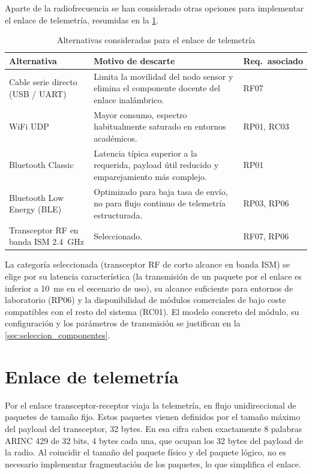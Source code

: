 Aparte de la radiofrecuencia se han considerado otras opciones para implementar el enlace de telemetría, resumidas en la \cref{tab:alternativas_enlace}.

\vspace{1em}

\begin{table}[H]
    \centering
    \caption{Alternativas consideradas para el enlace de telemetría}
    \label{tab:alternativas_enlace}
    \begin{tabularx}{\linewidth}{p{4cm} X l}
        \toprule
        \textbf{Alternativa} & \textbf{Motivo de descarte} & \textbf{Req.\ asociado} \\
        \midrule
        Cable serie directo (USB / UART) & Limita la movilidad del nodo sensor y elimina el componente docente del enlace inalámbrico. & RF07 \\
        WiFi UDP & Mayor consumo, espectro habitualmente saturado en entornos académicos. & RP01, RC03 \\
        Bluetooth Classic & Latencia típica superior a la requerida, payload útil reducido y emparejamiento más complejo. & RP01 \\
        Bluetooth Low Energy (BLE) & Optimizado para baja tasa de envío, no para flujo continuo de telemetría estructurada. & RP03, RP06 \\
        Transceptor RF en banda ISM \SI{2.4}{\giga\hertz} & Seleccionado. & RF07, RP06 \\
        \bottomrule
    \end{tabularx}
\end{table}


La categoría seleccionada (transceptor RF de corto alcance en banda ISM)
se elige por su latencia característica (la transmisión de un paquete por el
enlace es inferior a \SI{10}{\milli\second} en el escenario de uso), su alcance suficiente para entornos
de laboratorio (RP06) y la disponibilidad de módulos comerciales de bajo coste
compatibles con el resto del sistema (RC01). El modelo concreto del módulo, su
configuración y los parámetros de transmisión se justifican en la \cref{sec:seleccion_componentes}.


\section{Enlace de telemetría}
\label{sec:enlace}

Por el enlace transceptor-receptor viaja la telemetría, en flujo unidireccional de paquetes de tamaño fijo. Estos paquetes vienen definidos por el tamaño máximo del payload del transceptor, 32 bytes. En esa cifra caben exactamente 8 palabras ARINC 429 de 32 bits, 4 bytes cada una, que ocupan los 32 bytes del payload de la radio. Al coincidir el tamaño del paquete físico y del paquete lógico, no es necesario implementar fragmentación de los paquetes, lo que simplifica el enlace.

